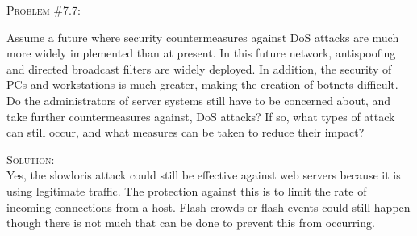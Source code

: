\documentclass[12pt]{article}
\newenvironment{problem}[1]
{\begin{mdframed}[linewidth=0.8pt]
        \textsc{Problem #1:}

}
    {\end{mdframed}}
\newenvironment{solution}
    {\textsc{Solution:}\\}
    {\newpage}%
\begin{document}
	\begin{problem}{\#7.7}
		Assume a future where security countermeasures against DoS attacks are much more widely implemented than at present. In this future network, antispoofing and directed broadcast filters are widely deployed. In addition, the security of PCs and workstations is much greater, making the creation of botnets difficult. Do the administrators of server systems still have to be concerned about, and take further countermeasures against, DoS attacks? If so, what types of attack can still occur, and what measures can be taken to reduce their impact?
	\end{problem}
	\begin{solution}
		Yes, the slowloris attack could still be effective against web servers because it is using legitimate traffic. The protection against this is to limit the rate of incoming connections from a host. Flash crowds or flash events could still happen though there is not much that can be done to prevent this from occurring. 
	\end{solution}
\end{document}
